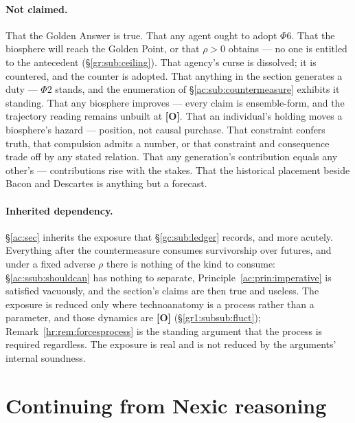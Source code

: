 \documentclass[11pt]{article}
\numberwithin{equation}{section}
\theoremstyle{plain}
\theoremstyle{definition}
\theoremstyle{remark}
\begin{document}
\paragraph{Not claimed.} That the Golden Answer is true. That any agent ought to adopt $\Phi6$. That the biosphere will reach the Golden Point, or that $\rho > 0$ obtains --- no one is entitled to the antecedent (\S\ref{gr:sub:ceiling}). That agency's curse is dissolved; it is countered, and the counter is adopted. That anything in the section generates a duty --- $\Phi2$ stands, and the enumeration of \S\ref{ac:sub:countermeasure} exhibits it standing. That any biosphere improves --- every claim is ensemble-form, and the trajectory reading remains unbuilt at \textbf{[O]}. That an individual's holding moves a biosphere's hazard --- position, not causal purchase. That constraint confers truth, that compulsion admits a number, or that constraint and consequence trade off by any stated relation. That any generation's contribution equals any other's --- contributions rise with the stakes. That the historical placement beside Bacon and Descartes is anything but a forecast.

\paragraph{Inherited dependency.} \S\ref{ac:sec} inherits the exposure that \S\ref{gc:sub:ledger} records, and more acutely. Everything after the countermeasure consumes survivorship over futures, and under a fixed adverse $\rho$ there is nothing of the kind to consume: \S\ref{ac:ssub:shouldcan} has nothing to separate, Principle~\ref{ac:prin:imperative} is satisfied vacuously, and the section's claims are then true and useless. The exposure is reduced only where technoanatomy is a process rather than a parameter, and those dynamics are \textbf{[O]} (\S\ref{gr1:subsub:fluct}); Remark~\ref{hr:rem:forcesprocess} is the standing argument that the process is required regardless. The exposure is real and is not reduced by the arguments' internal soundness.

\section{Continuing from Nexic reasoning}\label{gc:sec}
\end{document}
